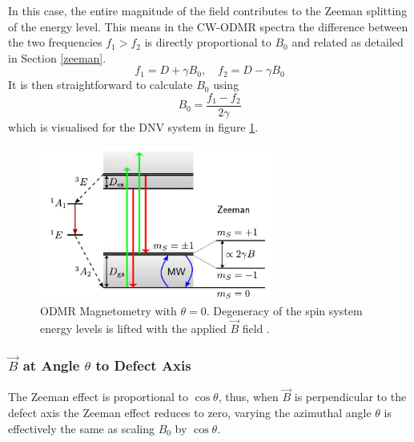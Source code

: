 In this case, the entire magnitude of the field contributes to the Zeeman splitting of the energy level. This means in the CW-ODMR spectra the difference between the two frequencies $f_1 > f_2$ is directly proportional to $B_0$ and related as detailed in Section \ref{zeeman}.
$$f_1 = D + \gamma B_0,  \quad f_2 = D - \gamma B_0$$
It is then straightforward to calculate $B_0$ using
\begin{equation}
	B_0 = \frac{f_1 - f_2}{2 \gamma}
	\label{eq:s1_parallel_magnetometry}
\end{equation}
which is visualised for the DNV system in figure \ref{fig:spin1_magnetometry}.

\begin{figure}[h]
	\begin{center}
		\includegraphics[width=0.7\textwidth]{figures/DNV-ODMR.pdf}
	\end{center}
	\caption{ODMR Magnetometry with $\theta = 0$. Degeneracy of the spin system energy levels is lifted with the applied $\vec{B}$ field \cite{Strner2021}. }
	\label{fig:spin1_magnetometry}
\end{figure}
%

\subsubsection{$\vec{B}$ at Angle $\theta$ to Defect Axis}
The Zeeman effect is proportional to $\cos\theta$, thus, when $\vec{B}$ is perpendicular to the defect axis the Zeeman effect reduces to zero, varying the azimuthal angle $\theta$ is effectively the same as scaling $B_0$ by $\cos \theta$.


